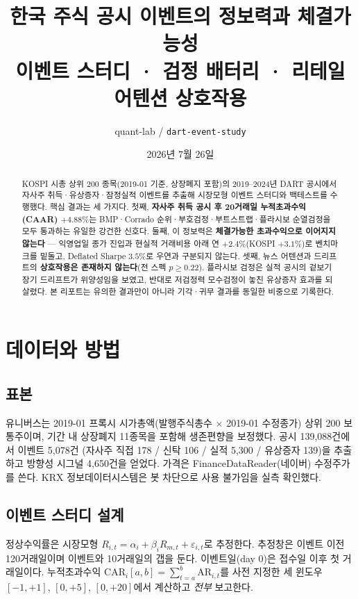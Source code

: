 \documentclass[11pt,a4paper]{article}
\title{\vspace{-1.5cm}\textbf{한국 주식 공시 이벤트의 정보력과 체결가능성}\\
\large 이벤트 스터디 · 검정 배터리 · 리테일 어텐션 상호작용}
\author{quant-lab / \texttt{dart-event-study}}
\date{2026년 7월 26일}
\newcommand{\sig}[1]{\textbf{#1}}
\begin{document}
\maketitle
\thispagestyle{fancy}

\begin{abstract}
\noindent
KOSPI 시총 상위 200 종목(2019-01 기준, 상장폐지 포함)의 2019--2024년 DART 공시에서
자사주 취득·유상증자·잠정실적 이벤트를 추출해 시장모형 이벤트 스터디와 백테스트를 수행했다.
핵심 결과는 세 가지다. 첫째, \sig{자사주 취득 공시 후 20거래일 누적초과수익(CAAR) $+4.88\%$}는
BMP·Corrado 순위·부호검정·부트스트랩·플라시보 순열검정을 모두 통과하는 유일한 강건한 신호다.
둘째, 이 정보력은 \sig{체결가능한 초과수익으로 이어지지 않는다} --- 익영업일 종가 진입과 현실적
거래비용 아래 연 $+2.4\%$(KOSPI $+3.1\%$)로 벤치마크를 밑돌고, Deflated Sharpe $3.5\%$로
우연과 구분되지 않는다. 셋째, 뉴스 어텐션과 드리프트의 \sig{상호작용은 존재하지 않는다}(전 스펙
$p \ge 0.22$). 플라시보 검정은 실적 공시의 겉보기 장기 드리프트가 위양성임을 보였고, 반대로
저검정력 모수검정이 놓친 유상증자 효과를 되살렸다. 본 리포트는 유의한 결과만이 아니라
기각·귀무 결과를 동일한 비중으로 기록한다.
\end{abstract}

\section{데이터와 방법}

\subsection{표본}
유니버스는 2019-01 프록시 시가총액(발행주식총수 $\times$ 2019-01 수정종가) 상위 200 보통주이며,
기간 내 상장폐지 11종목을 포함해 생존편향을 보정했다. 공시 139{,}088건에서 이벤트 5{,}078건
(자사주 직접 178 / 신탁 106 / 실적 5{,}300 / 유상증자 139)을 추출하고 방향성 시그널 4{,}650건을 얻었다.
가격은 FinanceDataReader(네이버) 수정주가를 쓴다. KRX 정보데이터시스템은 봇 차단으로 사용 불가임을
실측 확인했다.

\subsection{이벤트 스터디 설계}
정상수익률은 시장모형 $R_{i,t} = \alpha_i + \beta_i R_{m,t} + \varepsilon_{i,t}$로 추정한다.
추정창은 이벤트 이전 120거래일이며 이벤트와 10거래일의 갭을 둔다. 이벤트일(day 0)은 접수일 이후
첫 거래일이다. 누적초과수익 $\mathrm{CAR}_i[a,b] = \sum_{t=a}^{b} \mathrm{AR}_{i,t}$를
사전 지정한 세 윈도우 $[-1,+1]$, $[0,+5]$, $[0,+20]$에서 계산하고 \emph{전부} 보고한다.
\end{document}
